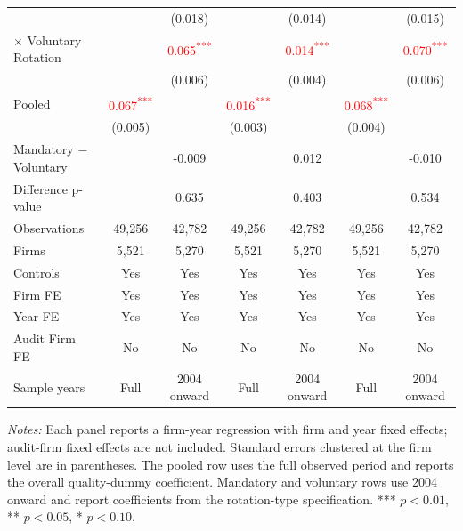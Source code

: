 \documentclass[10pt]{article}
\newcommand{\sym}[1]{\textsuperscript{#1}}
\begin{document}
\begin{minipage}{19cm}
\begin{threeparttable}
\begin{tabular}{l cc cc cc}
 &  & (0.018) &  & (0.014) &  & (0.015) \\
$\times$ Voluntary Rotation &  & \textcolor{red}{0.065\sym{***}} &  & \textcolor{red}{0.014\sym{***}} &  & \textcolor{red}{0.070\sym{***}} \\
 &  & (0.006) &  & (0.004) &  & (0.006) \\
Pooled & \textcolor{red}{0.067\sym{***}} &  & \textcolor{red}{0.016\sym{***}} &  & \textcolor{red}{0.068\sym{***}} &  \\
 & (0.005) &  & (0.003) &  & (0.004) &  \\
Mandatory $-$ Voluntary &  & -0.009 &  & 0.012 &  & -0.010 \\
Difference p-value &  & 0.635 &  & 0.403 &  & 0.534 \\
Observations & 49,256 & 42,782 & 49,256 & 42,782 & 49,256 & 42,782 \\
Firms & 5,521 & 5,270 & 5,521 & 5,270 & 5,521 & 5,270 \\
\midrule
Controls & Yes & Yes & Yes & Yes & Yes & Yes \\
Firm FE & Yes & Yes & Yes & Yes & Yes & Yes \\
Year FE & Yes & Yes & Yes & Yes & Yes & Yes \\
Audit Firm FE & No & No & No & No & No & No \\
Sample years & Full & 2004 onward & Full & 2004 onward & Full & 2004 onward \\
\bottomrule
\end{tabular}
\begin{tablenotes}\fontsize{9}{11}\selectfont
\item \fontsize{9}{11}\selectfont \textit{Notes:} Each panel reports a firm-year regression with firm and year fixed effects; audit-firm fixed effects are not included. Standard errors clustered at the firm level are in parentheses. The pooled row uses the full observed period and reports the overall quality-dummy coefficient. Mandatory and voluntary rows use 2004 onward and report coefficients from the rotation-type specification. *** \(p<0.01\), ** \(p<0.05\), * \(p<0.10\).
\end{tablenotes}
\end{threeparttable}

\end{minipage}
\end{document}
